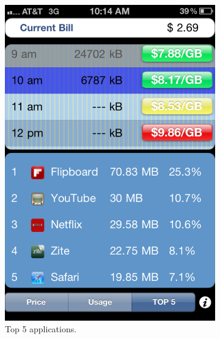 \begin{figure}[t]
\begin{center}
\begin{subfigure}[b]{0.22\textwidth}
	\includegraphics[width=\textwidth]{Figures/iphone_ui3.pdf}
	\caption{Top 5 applications.}
\end{subfigure}
%
\begin{subfigure}[b]{0.22\textwidth}

\end{subfigure}
\end{center}
\end{figure}

